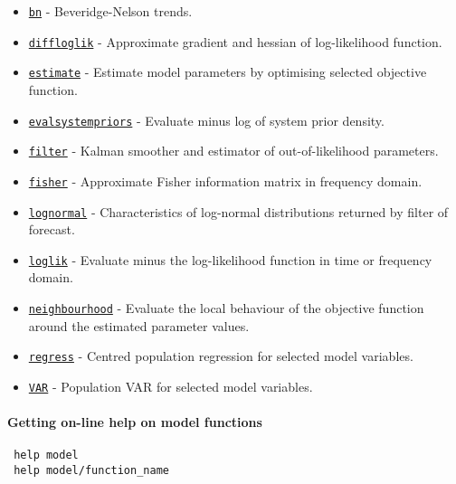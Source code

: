  \begin{itemize}
 \item
   \href{model/bn}{\texttt{bn}} - Beveridge-Nelson trends.
 \item
   \href{model/diffloglik}{\texttt{diffloglik}} - Approximate gradient
   and hessian of log-likelihood function.
 \item
   \href{model/estimate}{\texttt{estimate}} - Estimate model parameters
   by optimising selected objective function.
 \item
   \href{model/evalsystempriors}{\texttt{evalsystempriors}} - Evaluate
   minus log of system prior density.
 \item
   \href{model/filter}{\texttt{filter}} - Kalman smoother and estimator
   of out-of-likelihood parameters.
 \item
   \href{model/fisher}{\texttt{fisher}} - Approximate Fisher information
   matrix in frequency domain.
 \item
   \href{model/lognormal}{\texttt{lognormal}} - Characteristics of
   log-normal distributions returned by filter of forecast.
 \item
   \href{model/loglik}{\texttt{loglik}} - Evaluate minus the
   log-likelihood function in time or frequency domain.
 \item
   \href{model/neighbourhood}{\texttt{neighbourhood}} - Evaluate the
   local behaviour of the objective function around the estimated
   parameter values.
 \item
   \href{model/regress}{\texttt{regress}} - Centred population regression
   for selected model variables.
 \item
   \href{model/VAR}{\texttt{VAR}} - Population VAR for selected model
   variables.
 \end{itemize}
 
 \paragraph{Getting on-line help on model functions}
 
 \begin{verbatim}
 help model
 help model/function_name
 \end{verbatim}



